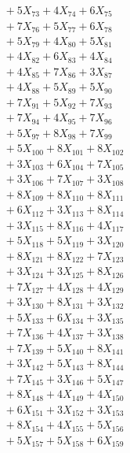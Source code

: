 \documentclass[a4paper,10pt]{article}
\begin{document}
{\begin{align}
&\;  + 5 X_{73} + 4 X_{74} + 6 X_{75} \\[0.3ex]
&\;  + 7 X_{76} + 5 X_{77} + 6 X_{78} \\[0.3ex]
&\;  + 5 X_{79} + 4 X_{80} + 5 X_{81} \\[0.3ex]
&\;  + 4 X_{82} + 6 X_{83} + 4 X_{84} \\[0.3ex]
&\;  + 4 X_{85} + 7 X_{86} + 3 X_{87} \\[0.3ex]
&\;  + 4 X_{88} + 5 X_{89} + 5 X_{90} \\[0.3ex]
&\;  + 7 X_{91} + 5 X_{92} + 7 X_{93} \\[0.3ex]
&\;  + 7 X_{94} + 4 X_{95} + 7 X_{96} \\[0.3ex]
&\;  + 5 X_{97} + 8 X_{98} + 7 X_{99} \\[0.5ex]\allowbreak
&\;  + 5 X_{100} + 8 X_{101} + 8 X_{102} \\[0.3ex]
&\;  + 3 X_{103} + 6 X_{104} + 7 X_{105} \\[0.3ex]
&\;  + 3 X_{106} + 7 X_{107} + 3 X_{108} \\[0.3ex]
&\;  + 8 X_{109} + 8 X_{110} + 8 X_{111} \\[0.3ex]
&\;  + 6 X_{112} + 3 X_{113} + 8 X_{114} \\[0.3ex]
&\;  + 3 X_{115} + 8 X_{116} + 4 X_{117} \\[0.3ex]
&\;  + 5 X_{118} + 5 X_{119} + 3 X_{120} \\[0.3ex]
&\;  + 8 X_{121} + 8 X_{122} + 7 X_{123} \\[0.3ex]
&\;  + 3 X_{124} + 3 X_{125} + 8 X_{126} \\[0.3ex]
&\;  + 7 X_{127} + 4 X_{128} + 4 X_{129} \\[0.5ex]\allowbreak
&\;  + 3 X_{130} + 8 X_{131} + 3 X_{132} \\[0.3ex]
&\;  + 5 X_{133} + 6 X_{134} + 3 X_{135} \\[0.3ex]
&\;  + 7 X_{136} + 4 X_{137} + 3 X_{138} \\[0.3ex]
&\;  + 7 X_{139} + 5 X_{140} + 8 X_{141} \\[0.3ex]
&\;  + 3 X_{142} + 5 X_{143} + 8 X_{144} \\[0.3ex]
&\;  + 7 X_{145} + 3 X_{146} + 5 X_{147} \\[0.3ex]
&\;  + 8 X_{148} + 4 X_{149} + 4 X_{150} \\[0.3ex]
&\;  + 6 X_{151} + 3 X_{152} + 3 X_{153} \\[0.3ex]
&\;  + 8 X_{154} + 4 X_{155} + 5 X_{156} \\[0.3ex]
&\;  + 5 X_{157} + 5 X_{158} + 6 X_{159} \\[0.5ex]\allowbreak

\end{align}}
\end{document}
